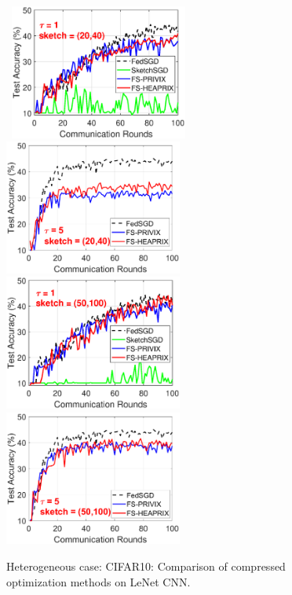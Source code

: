 \documentclass{article} %
\begin{document}
\begin{figure}[h]
	\begin{center}
		\mbox{%
\includegraphics[width=2.3in]{CIFAR_figures/cifar_local1_sketch20_iid0_test_acc.eps} 
		\includegraphics[width=2.3in]{CIFAR_figures/cifar_local5_sketch20_iid0_test_acc.eps}
		}
		\mbox{%
		\includegraphics[width=2.3in]{CIFAR_figures/cifar_local1_sketch50_iid0_test_acc.eps}
		\includegraphics[width=2.3in]{CIFAR_figures/cifar_local5_sketch50_iid0_test_acc.eps}
		}
	\end{center}
	\caption{Heterogeneous case: CIFAR10: Comparison of compressed optimization methods on LeNet CNN.}
    \label{fig:CIFAR-heter}
\end{figure}
\end{document}
